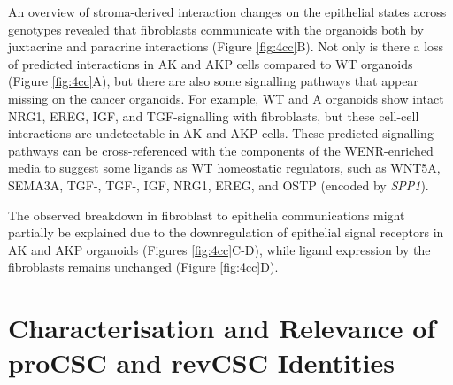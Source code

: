 An overview of stroma-derived interaction changes on the epithelial states across genotypes revealed that fibroblasts communicate with the organoids both by juxtacrine and paracrine interactions (Figure \ref{fig:4cc}B). Not only is there a loss of predicted interactions in AK and AKP cells compared to WT organoids (Figure \ref{fig:4cc}A), but there are also some signalling pathways that appear missing on the cancer organoids. For example, WT and A organoids show intact NRG1, EREG, IGF, and TGF-\textbeta\hspace{0.1cm}signalling with fibroblasts, but these cell-cell interactions are undetectable in AK and AKP cells. These predicted signalling pathways can be cross-referenced with the components of the WENR-enriched media to suggest some ligands as WT homeostatic regulators, such as WNT5A, SEMA3A, TGF-, TGF-, IGF, NRG1, EREG, and OSTP (encoded by \emph{SPP1}).

The observed breakdown in fibroblast to epithelia communications might partially be explained due to the downregulation of epithelial signal receptors in AK and AKP organoids (Figures \ref{fig:4cc}C-D), while ligand expression by the fibroblasts remains unchanged (Figure \ref{fig:4cc}D).


\section{Characterisation and Relevance of proCSC and revCSC Identities}

